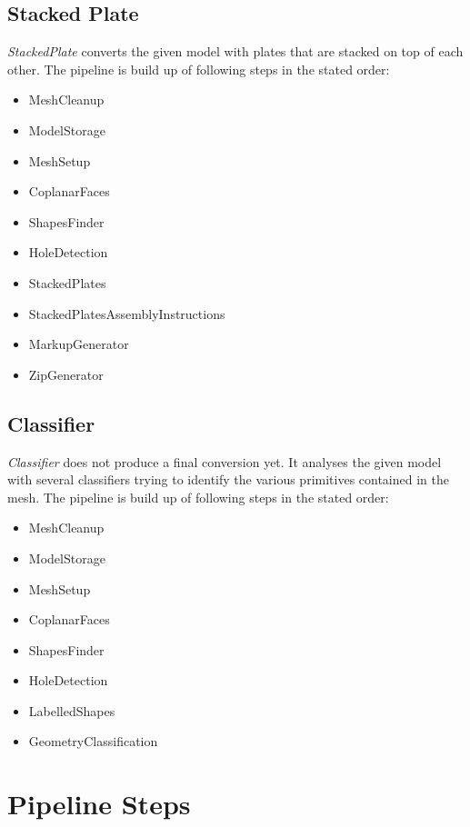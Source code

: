 \documentclass[../ClassicThesis.tex]{subfiles}
\begin{document}
\subsection{Stacked Plate}

\emph{StackedPlate} converts the given model with plates that are stacked on top of each other. The pipeline is build up of following steps in the stated order:

\begin{itemize}
    \item MeshCleanup
    \item ModelStorage
    \item MeshSetup
    \item CoplanarFaces
    \item ShapesFinder
    \item HoleDetection
    \item StackedPlates
    \item StackedPlatesAssemblyInstructions
    \item MarkupGenerator
    \item ZipGenerator
\end{itemize}


\subsection{Classifier}

\emph{Classifier} does not produce a final conversion yet. It analyses the given model with several classifiers trying to identify the various primitives contained in the mesh. The pipeline is build up of following steps in the stated order:

\begin{itemize}
    \item MeshCleanup
    \item ModelStorage
    \item MeshSetup
    \item CoplanarFaces
    \item ShapesFinder
    \item HoleDetection
    \item LabelledShapes
    \item GeometryClassification
\end{itemize}



\section{Pipeline Steps}
\end{document}
